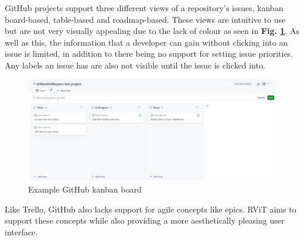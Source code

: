\documentclass[l4proj.tex]{subfiles}
\begin{document}
GitHub projects support three different views of a repository's issues, kanban board-based, table-based and roadmap-based. These views are intuitive to use but are not very visually appealing due to the lack of colour as seen in \textbf{Fig. \ref{fig:GitHub kanban}}. As well as this, the information that a developer can gain without clicking into an issue is limited, in addition to there being no support for setting issue priorities. Any labels an issue has are also not visible until the issue is clicked into.


\begin{figure}[h!]
\begin{center}
\includegraphics[scale=0.27]{dissertation/images/GitHubKanbanBoard.png}
\caption{Example GitHub kanban board}
\label{fig:GitHub kanban} 
\end{center}
\end{figure}


Like Trello, GitHub also lacks support for agile concepts like epics. RViT aims to support these concepts while also providing a more aesthetically pleasing user interface. 
\end{document}
